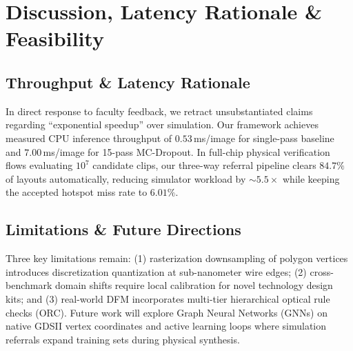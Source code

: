 \documentclass[conference]{IEEEtran}
\begin{document}
\begin{table}[htbp]
\caption{Quantitative Grad-CAM Metrics Across ICCAD-12 Benchmarks.}
\label{tab:gradcam}
\centering
{}
\end{table}

\section{Discussion, Latency Rationale \& Feasibility}

\subsection{Throughput \& Latency Rationale}
In direct response to faculty feedback, we retract unsubstantiated claims regarding ``exponential speedup'' over simulation. Our framework achieves measured CPU inference throughput of $0.53$\,ms/image for single-pass baseline and $7.00$\,ms/image for 15-pass MC-Dropout. In full-chip physical verification flows evaluating $10^7$ candidate clips, our three-way referral pipeline clears $84.7\%$ of layouts automatically, reducing simulator workload by $\sim 5.5\times$ while keeping the accepted hotspot miss rate to $6.01\%$.

\subsection{Limitations \& Future Directions}
Three key limitations remain: (1) rasterization downsampling of polygon vertices introduces discretization quantization at sub-nanometer wire edges; (2) cross-benchmark domain shifts require local calibration for novel technology design kits; and (3) real-world DFM incorporates multi-tier hierarchical optical rule checks (ORC). Future work will explore Graph Neural Networks (GNNs) on native GDSII vertex coordinates and active learning loops where simulation referrals expand training sets during physical synthesis.
\end{document}

